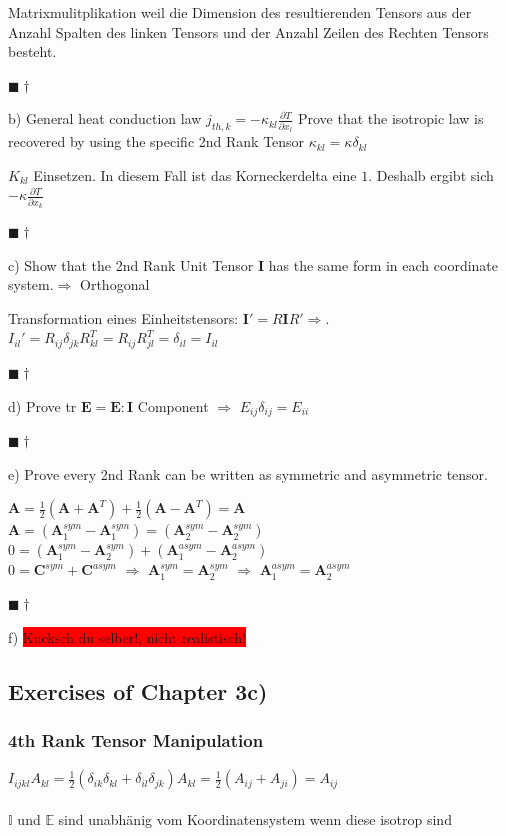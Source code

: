 \documentclass[a4paper]{scrartcl}
\newcommand{\qed}{\begin{flushright}
$\blacksquare \dagger$ \end{flushright}}
\begin{document}
Matrixmulitplikation weil die Dimension des resultierenden Tensors aus der
Anzahl Spalten des linken Tensors und der Anzahl Zeilen des Rechten Tensors
besteht. \qed

b) General heat conduction law $j_{th,k}=-\kappa_{kl}\frac{\partial
T}{\partial x_l}$ Prove that the isotropic law is recovered by using the
specific 2nd Rank Tensor $\kappa_{kl}=\kappa \delta_{kl}$

$K_{kl}$ Einsetzen. In diesem Fall ist das Korneckerdelta eine $1$. Deshalb
ergibt sich $-\kappa \frac{\partial T}{\partial x_k}$ \qed

c) Show that the 2nd Rank Unit Tensor $\mathbf{I}$ has the same form in each
coordinate system.$\Rightarrow$ Orthogonal

Transformation eines Einheitstensors: $\mathbf{I}'=R\mathbf{I}R'\Rightarrow$.
$I_{il}'=R_{ij}\delta_{jk}R_{kl}^T = R_{ij}R_{jl}^T=\delta_{il}=I_{il}$ \qed



d) Prove tr $\mathbf{E}=\mathbf{E : I}$
Component $\Rightarrow$ $E_{ij}\delta_{ij}=E_{ii}$ \qed

e) Prove every 2nd Rank can be written as symmetric and asymmetric tensor.

$\mathbf{A}=\frac{1}{2}\left(\mathbf{A} + \mathbf{A}^T\right)+
\frac{1}{2}\left(\mathbf{A}-\mathbf{A}^T\right) = \mathbf{A}$ \\
$\mathbf{A}=\left(\mathbf{A}_1^{sym}-\mathbf{A}_1^{sym}\right)=\left(\mathbf{A}_2^{sym}-\mathbf{A}_2^{sym}\right)$
\\
$0=\left(\mathbf{A}_1^{sym}-\mathbf{A}_2^{sym}\right)+\left(\mathbf{A}_1^{asym}-\mathbf{A}_2^{asym}\right)$
\\
$0=\mathbf{C}^{sym}+\mathbf{C}^{asym}$ $\Rightarrow$
$\mathbf{A}_1^{sym}=\mathbf{A}_2^{sym}$ $\Rightarrow$
$\mathbf{A}_1^{asym}=\mathbf{A}_2^{asym}$ \qed


f) \colorbox{red}{Kucksch du selber!, nicht realistisch!}




\subsection{Exercises of Chapter 3c)}

\subsubsection{4th Rank Tensor Manipulation}


$I_{ijkl}A_{kl}=\frac{1}{2}(\delta_{ik}\delta_{kl}+\delta_{il}\delta_{jk})A_{kl}=\frac{1}{2}(A_{ij}+A_{ji})=A_{ij}$
\\
\\
$ \mathbb{I} $ und $ \mathbb{E} $ sind unabhänig vom Koordinatensystem wenn diese isotrop sind
\end{document}
